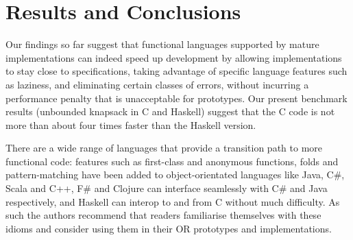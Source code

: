 \section{Results and Conclusions}

Our findings so far suggest that functional languages supported by mature
implementations can indeed speed up development by allowing implementations to
stay close to specifications, taking advantage of specific language features
such as laziness, and eliminating certain classes of errors, without incurring
a performance penalty that is unacceptable for prototypes. Our present
benchmark results (unbounded knapsack in C and Haskell) suggest that the C
code is not more than about four times faster than the Haskell version.

There are a wide range of languages that provide a transition path to more functional code: features such as first-class and anonymous functions, folds and pattern-matching have been added to object-orientated languages like Java, C\#, Scala and C++, F\# and Clojure can interface seamlessly with C\# and Java respectively, and Haskell can interop to and from C without much difficulty. As such the authors recommend that readers familiarise themselves with these idioms and consider using them in their OR prototypes and implementations.
